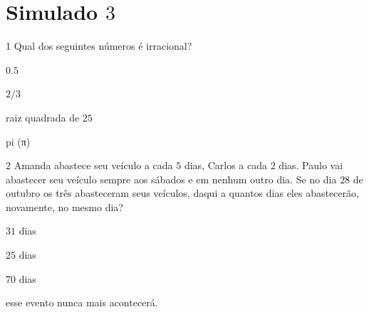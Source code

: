 
\section*{Simulado $3$}

\num{1}  Qual dos seguintes números é irracional?

\begin{escolha}
\item $0.5$
\item $2/3$
\item raiz quadrada de $25$
\item pi (π)
\end{escolha}



\num{2}  Amanda abastece seu veículo a cada $5$ dias, Carlos a cada $2$ dias.
Paulo vai abastecer seu veículo sempre aos sábados e em nenhum outro
dia. Se no dia $28$ de outubro os três abasteceram seus veículos, daqui a
quantos dias eles abastecerão, novamente, no mesmo dia?

\begin{escolha}
\item $31$ dias
\item $25$ dias
\item $70$ dias
\item esse evento nunca mais acontecerá.
\end{escolha}

